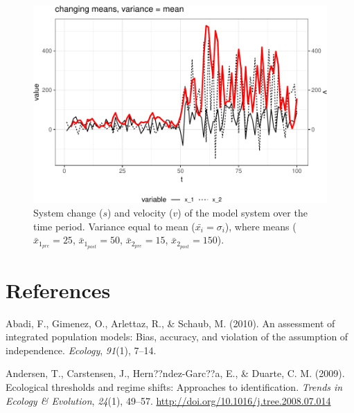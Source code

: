 \documentclass[12pt,twoside,openany]{reedthesis}
\begin{document}
\begin{figure}

{\centering \includegraphics[width=0.95\linewidth]{_myDissertation_files/figure-latex/velocSysEx4-1} 

}

\caption{System change ($s$) and velocity ($v$) of the model system over the time period. Variance equal to mean ($\bar{x_i}=\sigma_i$), where means ($\bar{x}_{1_{pre}}=25$, $\bar{x}_{1_{post}}=50$, $\bar{x}_{2_{pre}}=15$, $\bar{x}_{2_{post}}=150$).}\label{fig:velocSysEx4}
\end{figure}
\backmatter

\hypertarget{references}{%
\chapter*{References}\label{references}}


\noindent

\setlength{\parindent}{-0.20in}
\setlength{\leftskip}{0.20in}
\setlength{\parskip}{8pt}

\hypertarget{refs}{}
\leavevmode\hypertarget{ref-abadi2010assessment}{}%
Abadi, F., Gimenez, O., Arlettaz, R., \& Schaub, M. (2010). An assessment of integrated population models: Bias, accuracy, and violation of the assumption of independence. \emph{Ecology}, \emph{91}(1), 7--14.

\leavevmode\hypertarget{ref-andersen_ecological_2009}{}%
Andersen, T., Carstensen, J., Hern??ndez-Garc??a, E., \& Duarte, C. M. (2009). Ecological thresholds and regime shifts: Approaches to identification. \emph{Trends in Ecology \& Evolution}, \emph{24}(1), 49--57. \url{http://doi.org/10.1016/j.tree.2008.07.014}
\end{document}
